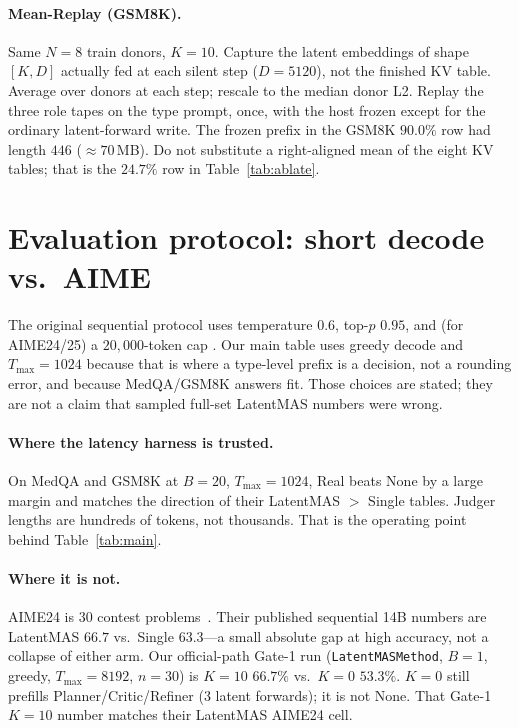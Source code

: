 \documentclass[11pt]{article}
\begin{document}
\paragraph{Mean-Replay (GSM8K).}
Same $N{=}8$ train donors, $K{=}10$.
Capture the latent embeddings of shape $[K,D]$ actually fed at each
silent step ($D{=}5120$), not the finished KV table.
Average over donors at each step; rescale to the median donor L2.
Replay the three role tapes on the type prompt, once, with the host
frozen except for the ordinary latent-forward write.
The frozen prefix in the GSM8K $90.0\%$ row had length $446$
($\approx 70$\,MB).
Do not substitute a right-aligned mean of the eight KV tables; that is
the $24.7\%$ row in Table~\ref{tab:ablate}.

\section{Evaluation protocol: short decode vs.\ AIME}
\label{app:eval}
The original sequential protocol uses temperature $0.6$, top-$p$
$0.95$, and (for AIME24/25) a $20{,}000$-token cap
\citep{zou2025latentmas}.
Our main table uses greedy decode and $T_{\max}{=}1024$ because that is
where a type-level prefix is a decision, not a rounding error, and
because MedQA/GSM8K answers fit.
Those choices are stated; they are not a claim that sampled full-set
LatentMAS numbers were wrong.

\paragraph{Where the latency harness is trusted.}
On MedQA and GSM8K at $B{=}20$, $T_{\max}{=}1024$, Real beats None by
a large margin and matches the direction of their LatentMAS $>$ Single
tables.
Judger lengths are hundreds of tokens, not thousands.
That is the operating point behind Table~\ref{tab:main}.

\paragraph{Where it is not.}
AIME24 is $30$ contest problems~\citep{aime2024}.
Their published sequential 14B numbers are LatentMAS $66.7$ vs.\ Single
$63.3$---a small absolute gap at high accuracy, not a collapse of
either arm.
Our official-path Gate-1 run (\texttt{LatentMASMethod}, $B{=}1$, greedy,
$T_{\max}{=}8192$, $n{=}30$) is $K{=}10$ \textbf{$66.7\%$} vs.\
$K{=}0$ $53.3\%$.
$K{=}0$ still prefills Planner/Critic/Refiner ($3$ latent forwards); it
is not None.
That Gate-1 $K{=}10$ number matches their LatentMAS AIME24 cell.
\end{document}
